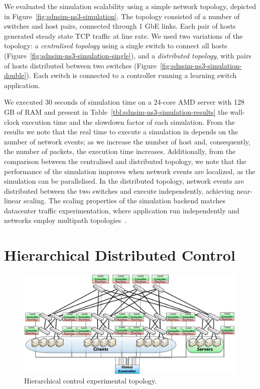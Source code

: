 We evaluated the \sdnsim simulation scalability using a simple network topology,
depicted in Figure~\ref{fig:sdnsim-ns3-simulation}.  The topology consisted of a
number of switches and host pairs, connected through 1 GbE links.  Each pair of
hosts generated steady state TCP traffic at line rate.  We used two variations of
the topology: a \textit{centralised topology} \/using a single switch to connect
all hosts (Figure~\ref{fig:sdnsim-ns3-simulation-single}), and a
\textit{distributed topology}, with pairs of hosts distributed between two
switches (Figure~\ref{fig:sdnsim-ns3-simulation-double}).  Each switch is
connected to a controller running a learning switch application. 

We executed 30 seconds of simulation time on a 24-core AMD server with 128 GB of
RAM and present in Table~\ref{tbl:sdnsim-ns3-simulation-results} the wall-clock
execution time and the slowdown factor of each simulation.  From the results we
note that the real time to execute a simulation in \sdnsim depends on the number
of network events; as we increase the number of host and, consequently, the
number of packets, the execution time increases.  Additionally, from the
comparison between the centralised and distributed topology, we note that the
performance of the simulation improves when network events are localized, as the
simulation can be parallelised. In the distributed topology, network events are
distributed between the two switches and execute independently, achieving
near-linear scaling. The scaling properties of the \sdnsim simulation backend
matches datacenter traffic experimentation, where application run
independently and networks employ multipath topologies~. 

\section{Hierarchical Distributed Control}\label{sec:rdsf-eval}

\begin{figure}[h]
  \begin{center}
    \includegraphics[width=0.99\textwidth]{Chapter1/Chapter1Figs/hierarchy-topology}
  \end{center}
  \caption{Hierarchical control experimental topology.}
  \label{fig:sdnsim-use-case-topology}
\end{figure}

